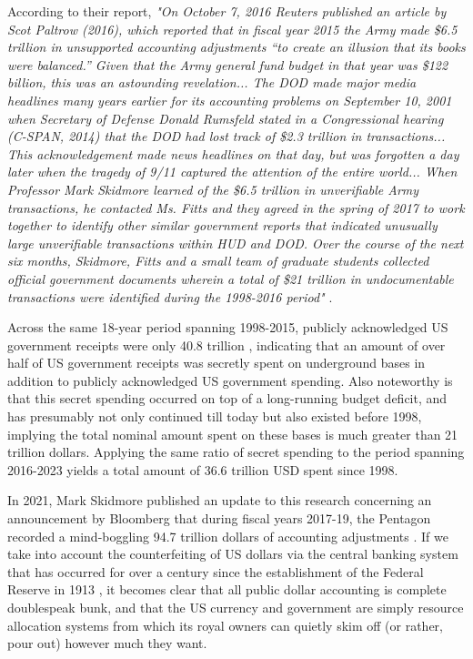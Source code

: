 \documentclass[10pt,twocolumn,letterpaper]{article}
\begin{document}
According to their report, \textit{"On October 7, 2016 Reuters published an article by Scot Paltrow (2016), which reported that in fiscal year 2015 the Army made \$6.5 trillion in unsupported accounting adjustments “to create an illusion that its books were balanced.” Given that the Army general fund budget in that year was \$122 billion, this was an astounding revelation... The DOD made major media headlines many years earlier for its accounting problems on September 10, 2001 when Secretary of Defense Donald Rumsfeld stated in a Congressional hearing (C-SPAN, 2014) that the DOD had lost track of \$2.3 trillion in transactions... This acknowledgement made news headlines on that day, but was forgotten a day later when the tragedy of 9/11 captured the attention of the entire world... When Professor Mark Skidmore learned of the \$6.5 trillion in unverifiable Army transactions, he contacted Ms. Fitts and they agreed in the spring of 2017 to work together to identify other similar government reports that indicated unusually large unverifiable transactions within HUD and DOD. Over the course of the next six months, Skidmore, Fitts and a small team of graduate students collected official government documents wherein a total of \$21 trillion in undocumentable transactions were identified during the 1998-2016 period"} \cite{12}.

Across the same 18-year period spanning 1998-2015, publicly acknowledged US government receipts were only 40.8 trillion \cite{15}, indicating that an amount of over half of US government receipts was secretly spent on underground bases in addition to publicly acknowledged US government spending. Also noteworthy is that this secret spending occurred on top of a long-running budget deficit, and has presumably not only continued till today but also existed before 1998, implying the total nominal amount spent on these bases is much greater than 21 trillion dollars. Applying the same ratio of secret spending to the period spanning 2016-2023 yields a total amount of 36.6 trillion USD spent since 1998.

In 2021, Mark Skidmore published an update to this research concerning an announcement by Bloomberg that during fiscal years 2017-19, the Pentagon recorded a mind-boggling 94.7 trillion dollars of accounting adjustments \cite{17,18}. If we take into account the counterfeiting of US dollars via the central banking system that has occurred for over a century since the establishment of the Federal Reserve in 1913 \cite{37}, it becomes clear that all public dollar accounting is complete doublespeak bunk, and that the US currency and government are simply resource allocation systems from which its royal owners can quietly skim off (or rather, pour out) however much they want.
\end{document}

